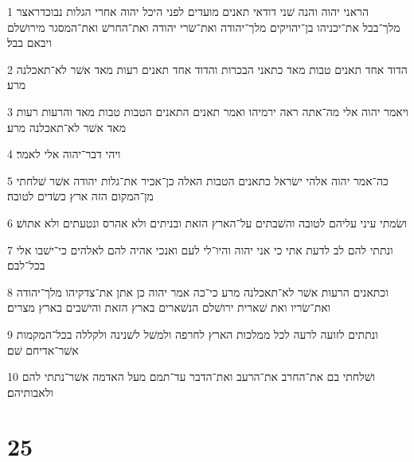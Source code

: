 \par 1 הראני יהוה והנה שׁני דודאי תאנים מועדים לפני היכל יהוה אחרי הגלות נבוכדראצר מלך־בבל את־יכניהו בן־יהויקים מלך־יהודה ואת־שׂרי יהודה ואת־החרשׁ ואת־המסגר מירושׁלם ויבאם בבל׃
\par 2 הדוד אחד תאנים טבות מאד כתאני הבכרות והדוד אחד תאנים רעות מאד אשׁר לא־תאכלנה מרע׃
\par 3 ויאמר יהוה אלי מה־אתה ראה ירמיהו ואמר תאנים התאנים הטבות טבות מאד והרעות רעות מאד אשׁר לא־תאכלנה מרע׃
\par 4 ויהי דבר־יהוה אלי לאמר׃
\par 5 כה־אמר יהוה אלהי ישׂראל כתאנים הטבות האלה כן־אכיר את־גלות יהודה אשׁר שׁלחתי מן־המקום הזה ארץ כשׂדים לטובה׃
\par 6 ושׂמתי עיני עליהם לטובה והשׁבתים על־הארץ הזאת ובניתים ולא אהרס ונטעתים ולא אתושׁ׃
\par 7 ונתתי להם לב לדעת אתי כי אני יהוה והיו־לי לעם ואנכי אהיה להם לאלהים כי־ישׁבו אלי בכל־לבם׃
\par 8 וכתאנים הרעות אשׁר לא־תאכלנה מרע כי־כה אמר יהוה כן אתן את־צדקיהו מלך־יהודה ואת־שׂריו ואת שׁארית ירושׁלם הנשׁארים בארץ הזאת והישׁבים בארץ מצרים׃
\par 9 ונתתים לזועה לרעה לכל ממלכות הארץ לחרפה ולמשׁל לשׁנינה ולקללה בכל־המקמות אשׁר־אדיחם שׁם׃
\par 10 ושׁלחתי בם את־החרב את־הרעב ואת־הדבר עד־תמם מעל האדמה אשׁר־נתתי להם ולאבותיהם׃

\chapter{25}

